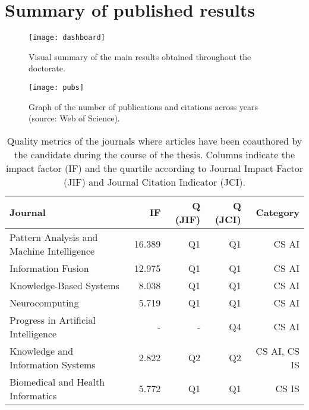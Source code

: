 \setchapterpreamble[u]{\margintoc}
\chapter{Summary of published results}
\label{ch:summary}
 
\begin{figure*}[htbp]
    \texttt{[image: dashboard]}
    \caption{\label{fig:dashboard}Visual summary of the main results obtained throughout the doctorate.}
\end{figure*}

\begin{figure*}
    \texttt{[image: pubs]}
    \caption{\label{fig:citations}Graph of the number of publications and citations across years (source: Web of Science).}
\end{figure*}

\begin{table*}
    \begin{tabular}[htbp]{lrrrr}
        \toprule
        Journal & IF & Q (JIF) & Q (JCI) & Category \\
        \midrule
        Pattern Analysis and Machine Intelligence
        & 16.389 & Q1 & Q1 & CS AI \\
        Information Fusion
        & 12.975 & Q1 & Q1 & CS AI \\
        Knowledge-Based Systems
        &  8.038 & Q1 & Q1 & CS AI \\
        Neurocomputing
        &  5.719 & Q1 & Q1 & CS AI \\
        Progress in Artificial Intelligence
        & - & - & Q4 & CS AI \\
        \midrule
        Knowledge and Information Systems 
        &  2.822 & Q2 & Q2 & CS AI, CS IS \\
        Biomedical and Health Informatics
        &  5.772 & Q1 & Q1 & CS IS \\
        \bottomrule
    \end{tabular}
    \caption{\label{tbl:journals}Quality metrics of the journals where articles have been coauthored by the candidate during the course of the thesis. Columns indicate the impact factor (IF) and the quartile according to Journal Impact Factor (JIF) and Journal Citation Indicator (JCI).}
\end{table*}